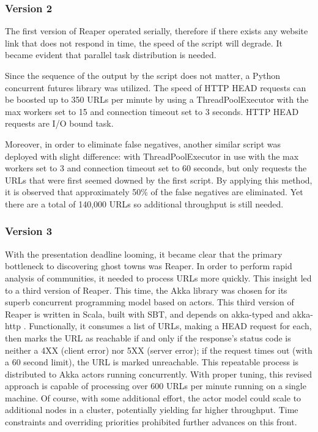\documentclass[conference]{IEEEtran}
\begin{document}
\subsubsection{Version 2}

The first version of Reaper operated serially, therefore if there exists any website link that does not respond in time, the speed of the script will degrade. It became evident that parallel task distribution is needed. 

Since the sequence of the output by the script does not matter, a Python concurrent futures library was utilized. The speed of HTTP HEAD requests can be boosted up to 350 URLs per minute by using a ThreadPoolExecutor with the max workers set to 15 and connection timeout set to 3 seconds. HTTP HEAD requests are I/O bound task.

Moreover, in order to eliminate false negatives, another similar script was deployed with slight difference: with ThreadPoolExecutor in use with the max workers set to 3 and connection timeout set to 60 seconds, but only requests the URLs that were first seemed downed by the first script. By applying this method, it is observed that approximately 50\% of the false negatives are eliminated. Yet there are a total of 140,000 URLs so additional throughput is still needed.

\subsubsection{Version 3}

With the presentation deadline looming, it became clear that the primary bottleneck to discovering ghost towns was Reaper. In order to perform rapid analysis of communities, it needed to process URLs more quickly. This insight led to a third version of Reaper. This time, the Akka library was chosen for its superb concurrent programming model based on actors. This third version of Reaper is written in Scala, built with SBT, and depends on akka-typed \cite{akkaTyped} and akka-http \cite{akkaHttp}. Functionally, it consumes a list of URLs, making a HEAD request for each, then marks the URL as reachable if and only if the response's status code is neither a 4XX (client error) nor 5XX (server error); if the request times out (with a 60 second limit), the URL is marked unreachable. This repeatable process is distributed to Akka actors running concurrently. With proper tuning, this revised approach is capable of processing over 600 URLs per minute running on a single machine. Of course, with some additional effort, the actor model could scale to additional nodes in a cluster, potentially yielding far higher throughput. Time constraints and overriding priorities prohibited further advances on this front.
\end{document}

